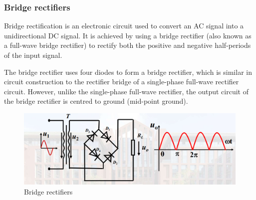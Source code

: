 \documentclass[UTF8]{article}
\begin{document}
  \subsubsection{Bridge rectifiers}
  Bridge rectification is an electronic circuit used to convert an AC signal into a unidirectional DC signal. It is achieved by using a bridge rectifier (also known as a full-wave bridge rectifier) to rectify both the positive and negative half-periods of the input signal.
  
  The bridge rectifier uses four diodes to form a bridge rectifier, which is similar in circuit construction to the rectifier bridge of a single-phase full-wave rectifier circuit. However, unlike the single-phase full-wave rectifier, the output circuit of the bridge rectifier is centred to ground (mid-point ground).

    	\begin{figure}[H]
    	    	\centering
    	    	\includegraphics[clip,scale=0.65,trim={0 0 0 0}]{fig/fig9.png}
    	        \caption{Bridge rectifiers}
    	        \label{figure.9}
        \end{figure}
  
\end{document}
